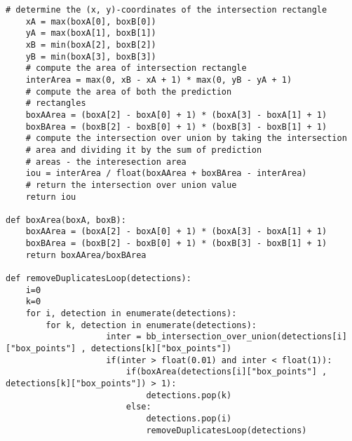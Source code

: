 \begin{lstlisting}[caption=Funções de eliminação de \textit{Bounding Boxes} sobrepostas e duplicadas, label=ap:IoU]
	# determine the (x, y)-coordinates of the intersection rectangle
	xA = max(boxA[0], boxB[0])
	yA = max(boxA[1], boxB[1])
	xB = min(boxA[2], boxB[2])
	yB = min(boxA[3], boxB[3])
	# compute the area of intersection rectangle
	interArea = max(0, xB - xA + 1) * max(0, yB - yA + 1)
	# compute the area of both the prediction
	# rectangles
	boxAArea = (boxA[2] - boxA[0] + 1) * (boxA[3] - boxA[1] + 1)
	boxBArea = (boxB[2] - boxB[0] + 1) * (boxB[3] - boxB[1] + 1)
	# compute the intersection over union by taking the intersection
	# area and dividing it by the sum of prediction
	# areas - the interesection area
	iou = interArea / float(boxAArea + boxBArea - interArea)
	# return the intersection over union value
	return iou

def boxArea(boxA, boxB):
	boxAArea = (boxA[2] - boxA[0] + 1) * (boxA[3] - boxA[1] + 1)
	boxBArea = (boxB[2] - boxB[0] + 1) * (boxB[3] - boxB[1] + 1)
	return boxAArea/boxBArea

def removeDuplicatesLoop(detections):
	i=0
	k=0
	for i, detection in enumerate(detections):
		for k, detection in enumerate(detections):
					inter = bb_intersection_over_union(detections[i]["box_points"] , detections[k]["box_points"])
					if(inter > float(0.01) and inter < float(1)):
						if(boxArea(detections[i]["box_points"] , detections[k]["box_points"]) > 1):
							detections.pop(k)
						else:
							detections.pop(i)
							removeDuplicatesLoop(detections)
							
\end{lstlisting}

